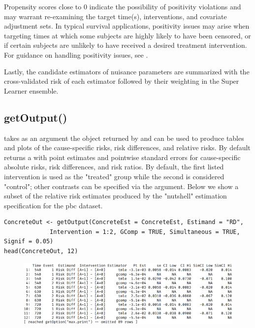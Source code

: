 \documentclass{report}
\newcommand{\1}{\ensuremath{\mathbf{1}}}
\begin{document}
Propensity scores close to 0 indicate the possibility of positivity violations and may warrant re-examining the target time(s), interventions, and covariate adjustment sets. In typical survival applications, positivity issues may arise when targeting times at which some subjects are highly likely to have been censored, or if certain subjects are unlikely to have received a desired treatment intervention. For guidance on handling positivity issues, see \cite{petersen_diagnosing_2012}.

Lastly, the candidate estimators of nuisance parameters are summarized with the cross-validated risk of each estimator followed by their weighting in the Super Learner ensemble. 

\subsection{getOutput()}
\label{getoutput}
 takes as an argument the  object returned by  and can be used to produce tables and plots of the cause-specific risks, risk differences, and relative risks. By default  returns a  with point estimates and pointwise standard errors for cause-specific absolute risks, risk differences, and risk ratios. By default, the first listed intervention is used as the "treated" group while the second is considered "control"; other contrasts can be specified via the  argument. Below we show a subset of the relative risk estimates produced by the "nutshell" estimation specification for the pbc dataset. 

\begin{lstlisting}
ConcreteOut <- getOutput(ConcreteEst = ConcreteEst, Estimand = "RD",
			 Intervention = 1:2, GComp = TRUE, Simultaneous = TRUE, Signif = 0.05)
head(ConcreteOut, 12)
\end{lstlisting}

\begin{figure}[H]
\centering
\includegraphics[width=\linewidth]{fig/rd-tbl.png}
\end{figure}
\end{document}
